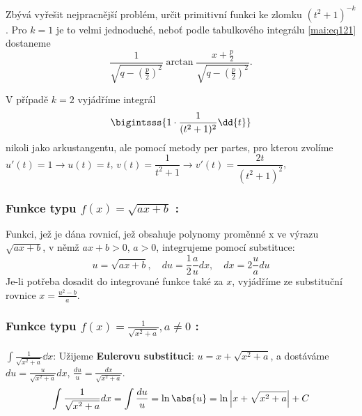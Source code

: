       Zbývá vyřešit nejpracnější problém, určit primitivní funkci ke zlomku \((t^2+1)^{-k}\). Pro
      \(k=1\) je to velmi jednoduché, neboť podle tabulkového integrálu \ref{mai:eq121} dostaneme
      \begin{equation*}\label{MA:int_ex_13}
        \frac{1}{\sqrt{q-\left(\frac{p}{2}\right)^2}}
            \arctan\frac{x+\frac{p}{2}}{\sqrt{q-\left(\frac{p}{2}\right)^2}}.     
      \end{equation*}   
      
      V případě \(k = 2\) vyjádříme integrál
      \begin{equation*}
        \bigintsss{1\cdot\dfrac{1}{(t^2 + 1)^{2}}\dd{t}}
      \end{equation*}
      nikoli jako arkustangentu, ale pomocí metody per partes, pro kterou zvolíme
      \(u'(t)=1\rightarrow u(t)=t\), \(v(t) = \dfrac{1}{t^2+1}\rightarrow v'(t) =
      \dfrac{2t}{(t^2+1)^2}\),
      
      \subsubsection*{Funkce typu $\boxed{f(x)=\sqrt{ax+b}}$ :}
         Funkci, jež je dána rovnicí, jež obsahuje polynomy proměnné x  ve výrazu $\sqrt{ax+b}$,
         v němž $ax+b>0$, $a>0$, integrujeme pomocí substituce:
         \begin{equation}\label{ma:eq_sub_fce1}
             u=\sqrt{ax+b},\quad du=\frac{1}{2}\frac{a}{u}dx,\quad dx=2\frac{u}{a}du
         \end{equation}
         Je-li potřeba dosadit do integrované funkce také za $x$, vyjádříme ze substituční
         rovnice $x=\frac{u^2-b}{a}$.
      \subsubsection*{Funkce typu $\boxed{f(x)=\frac{1}{\sqrt{x^2+a}}}, a\neq0$ :}
         \begin{example}\label{ma:ex_sub_metoda1}
           \(\int\frac{1}{\sqrt{x^2+a}}\dd{x}\):\vskip0.5mm
           Užijeme \textbf{Eulerovu substituci}: \(u=x+\sqrt{x^2+a}\), a dostáváme
           \(du=\frac{u}{\sqrt{x^2+a}}dx\), \(\frac{du}{u}=\frac{dx}{\sqrt{x^2+a}}\).
           \begin{equation*}
             \int{\frac{1}{\sqrt{x^2+a}}dx}=\int{\frac{du}{u}}=\ln\abs{u}
                                           =\ln\left\lvert x+\sqrt{x^2+a}\right\rvert+C
           \end{equation*}
         \end{example}
  
